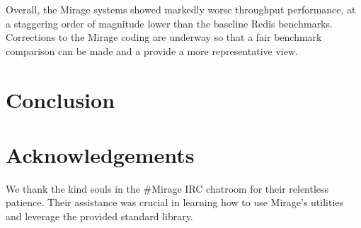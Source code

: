 \documentclass[english,10pt,twocolumn]{article}
\begin{document}
Overall, the Mirage systems showed markedly worse throughput performance, at a staggering order of magnitude lower than the baseline Redis benchmarks. 
Corrections to the Mirage coding are underway so that a fair benchmark comparison can be made and a provide a more representative view.

\section{Conclusion}


\section{Acknowledgements}
We thank the kind souls in the \#Mirage IRC chatroom for their relentless patience.
Their assistance was crucial in learning how to use Mirage's utilities and leverage the provided standard library.






\end{document}

